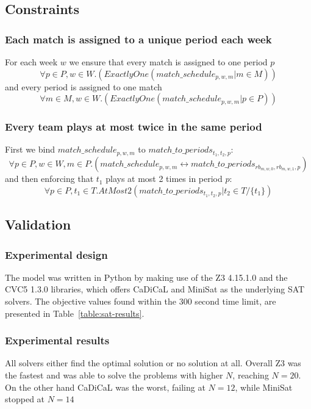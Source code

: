 \subsection{Constraints}
\subsubsection{Each match is assigned to a unique period each week}
For each week $w$ we ensure that every match is assigned to one period $p$
$$
    \forall p \in P, w \in W.(ExactlyOne(match\_schedule_{p, w, m} | m \in M))
$$
and every period is assigned to one match
$$
    \forall m \in M, w \in W.(ExactlyOne(match\_schedule_{p, w, m} | p \in P))
$$
\subsubsection{Every team plays at most twice in the same period}
First we bind $match\_schedule_{p, w, m}$ to $match\_to\_periods_{t_1, t_2, p}$:
$$
    \forall p \in P, w \in W, m \in P.(match\_schedule_{p, w, m} \leftrightarrow match\_to\_periods_{rb_{m, w, 0}, rb_{m, w, 1}, p})
$$
and then enforcing that $t_1$ plays at most 2 times in period $p$:
$$
    \forall p \in P, t_1 \in T. AtMost2(match\_to\_periods_{t_1, t_2, p} | t_2 \in T/\{t_1\})
$$
\subsection{Validation}
\subsubsection{Experimental design}
The model was written in Python by making use of the Z3 4.15.1.0 and the CVC5 1.3.0 libraries, which offers CaDiCaL and MiniSat as the underlying SAT solvers.
The objective values found within the 300 second time limit, are presented in Table~\ref{table:sat-results}. 
\subsubsection{Experimental results}
All solvers either find the optimal solution or no solution at all. Overall Z3 was the fastest and was able to solve the problems with higher $N$, reaching $N=20$. On the other hand CaDiCaL was the worst, failing at $N=12$, while MiniSat stopped at $N=14$

